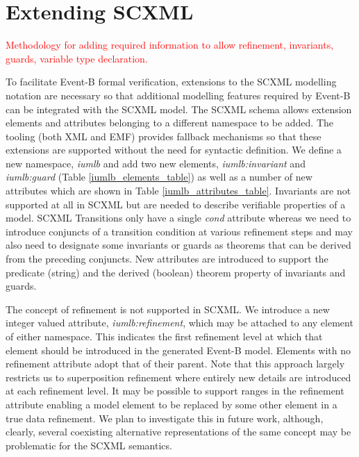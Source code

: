 
\section{Extending SCXML}
\label{sect:extension}

\textcolor{red}{Methodology for adding required information to allow refinement, invariants,
guards, variable type declaration.}

To facilitate Event-B formal verification, extensions to the SCXML modelling notation are necessary so that additional modelling features required by Event-B can be integrated with the SCXML model.
The SCXML schema allows extension elements and attributes belonging to a different namespace to be added. The tooling (both XML and EMF) provides fallback mechanisms so that these extensions are supported without the need for syntactic definition. We define a new namespace,  \emph{iumlb} and add two new elements, \emph{iumlb:invariant} and \emph{iumlb:guard} (Table \ref{iumlb_elements_table}) as well as a number of new attributes which are shown in Table \ref{iumlb_attributes_table}.
 Invariants are not supported at all in SCXML but are needed to describe verifiable properties of a model. SCXML Transitions only have a single \emph{cond} attribute whereas we need to introduce conjuncts of a transition condition at various refinement steps and may also need to designate some invariants or guards as theorems that can be derived from the preceding conjuncts. 
New attributes are introduced to support the predicate (string) and the derived (boolean) theorem property of invariants and guards.

The concept of refinement is not supported in SCXML. We introduce a new integer valued attribute, \emph{iumlb:refinement}, which may be attached to any element of either namespace. This indicates the first refinement level at which that element should be introduced in the generated Event-B model. Elements with no refinement attribute adopt that of their parent. Note that this approach largely restricts us to superposition refinement where entirely new details are introduced at each refinement level.  It may be possible to support ranges in the refinement attribute enabling a model element to be replaced by some other element in a true data refinement. We plan to investigate this in future work, although, clearly, several coexisting alternative representations of the same concept may be problematic for the SCXML semantics.


